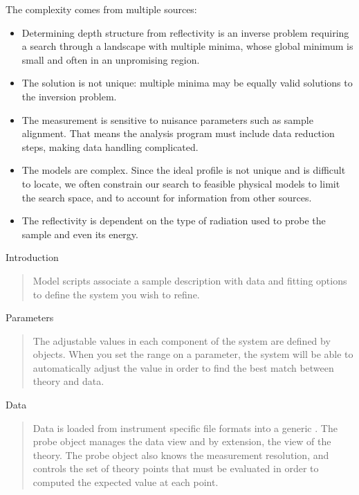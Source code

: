 \documentclass[letterpaper,10pt,english]{sphinxmanual}
\begin{document}
The complexity comes from multiple sources:
\begin{itemize}
\item {} 
Determining depth structure from reflectivity is an inverse problem
requiring a search through a landscape with multiple minima, whose
global minimum is small and often in an unpromising region.

\item {} 
The solution is not unique:  multiple minima may be equally valid
solutions to the inversion problem.

\item {} 
The measurement is sensitive to nuisance parameters such as sample
alignment.  That means the analysis program must include data
reduction steps, making data handling complicated.

\item {} 
The models are complex.  Since the ideal profile is not unique and
is difficult to locate, we often constrain our search to feasible
physical models to limit the search space, and to account for
information from other sources.

\item {} 
The reflectivity is dependent on the type of radiation used to probe
the sample and even its energy.

\end{itemize}

Introduction
\begin{quote}

Model scripts associate a sample description with data and fitting
options to define the system you wish to refine.
\end{quote}

Parameters
\begin{quote}

The adjustable values in each component of the system are defined
by {\hyperref[api/mystic.parameter:module-refl1d.mystic.parameter]{}} objects.  When you
set the range on a parameter, the system will be able to automatically
adjust the value in order to find the best match between theory
and data.
\end{quote}

Data
\begin{quote}

Data is loaded from instrument specific file
formats into a generic {\hyperref[api/probe:refl1d.probe.Probe]{}}.  The
probe object manages the data view and by extension, the view of
the theory.  The probe object also knows the measurement resolution,
and controls the set of theory points that must be evaluated
in order to computed the expected value at each point.
\end{quote}
\end{document}
